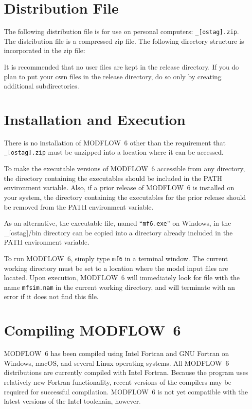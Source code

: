 \documentclass[11pt,twoside,twocolumn]{usgsreport}
\begin{document}
\section{Distribution File}
The following distribution file is for use on personal computers: \texttt{\modflowversion\_[ostag].zip}.  The distribution file is a compressed zip file. The following directory structure is incorporated in the zip file:



It is recommended that no user files are kept in the release directory.  If you do plan to put your own files in the release directory, do so only by creating additional subdirectories.

\section{Installation and Execution}
There is no installation of MODFLOW~6 other than the requirement that \texttt{\modflowversion\_[ostag].zip} must be unzipped into a location where it can be accessed.  

To make the executable versions of MODFLOW~6 accessible from any directory, the directory containing the executables should be included in the PATH environment variable.  Also, if a prior release of MODFLOW~6 is installed on your system, the directory containing the executables for the prior release should be removed from the PATH environment variable.

As an alternative, the executable file, named ``\texttt{mf6.exe}'' on Windows, in the \modflowversion\_[ostag]/bin directory can be copied into a directory already included in the PATH environment variable.

To run MODFLOW~6, simply type \texttt{mf6} in a terminal window.  The current working directory must be set to a location where the model input files are located.  Upon execution, MODFLOW~6 will immediately look for file with the name \texttt{mfsim.nam} in the current working directory, and will terminate with an error if it does not find this file.

\section{Compiling MODFLOW~6}
MODFLOW~6 has been compiled using Intel Fortran and GNU Fortran on Windows, macOS, and several Linux operating systems. All MODFLOW~6 distributions are currently compiled with Intel Fortran. Because the program uses relatively new Fortran functionality, recent versions of the compilers may be required for successful compilation. MODFLOW~6 is not yet compatible with the latest versions of the Intel toolchain, however.
\end{document}
